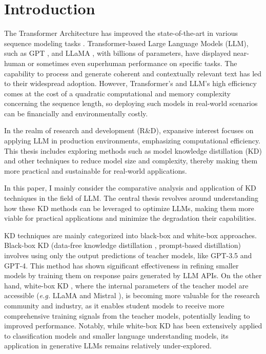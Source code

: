 \chapter{Introduction}
\label{chap:intro}

The Transformer Architecture has improved the state-of-the-art in various sequence modeling tasks \cite{attention}. Transformer-based Large Language Models (LLM), such as GPT \cite{gpt}, and LLaMA \cite{llama,llama2}, with billions of parameters, have displayed near-human or sometimes even superhuman performance on specific tasks. The capability to process and generate coherent and contextually relevant text has led to their widespread adoption. However, Transformer's and LLM's high efficiency comes at the cost of a quadratic computational and memory complexity concerning the sequence length, so deploying such models in real-world scenarios can be financially and environmentally costly.

In the realm of research and development (R\&D), expansive interest focuses on applying LLM in production environments, emphasizing computational efficiency. This thesis includes exploring methods such as model knowledge distillation (KD) and other techniques to reduce model size and complexity, thereby making them more practical and sustainable for real-world applications.

In this paper, I mainly consider the comparative analysis and application of KD techniques in the field of LLM\@. The central thesis revolves around understanding how these KD methods can be leveraged to optimize LLMs, making them more viable for practical applications and minimize the degradation their capabilities.

KD techniques are mainly categorized into black-box and white-box approaches. Black-box KD (data-free knowledge distillation \cite{dfkd}, prompt-based distillation) involves using only the output predictions of teacher models, like GPT-3.5 and GPT-4. This method has shown significant effectiveness in refining smaller models by training them on response pairs generated by LLM APIs. On the other hand, white-box KD \cite{distilling}, where the internal parameters of the teacher model are accessible (\textit{e.g.} LLaMA and Mistral \cite{mistral}), is becoming more valuable for the research community and industry, as it enables student models to receive more comprehensive training signals from the teacher models, potentially leading to improved performance. Notably, while white-box KD has been extensively applied to classification models and smaller language understanding models, its application in generative LLMs remains relatively under-explored.

